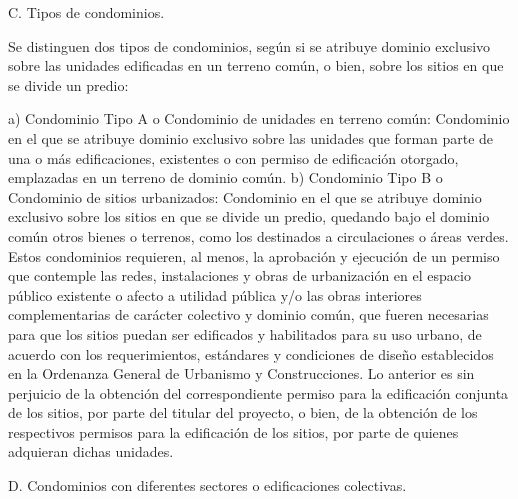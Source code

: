     C. Tipos de condominios.
     
    Se distinguen dos tipos de condominios, según si se atribuye dominio exclusivo sobre las unidades edificadas en un terreno común, o bien, sobre los sitios en que se divide un predio:
     
    a) Condominio Tipo A o Condominio de unidades en terreno común: Condominio en el que se atribuye dominio exclusivo sobre las unidades que forman parte de una o más edificaciones, existentes o con permiso de edificación otorgado, emplazadas en un terreno de dominio común.
    b) Condominio Tipo B o Condominio de sitios urbanizados: Condominio en el que se atribuye dominio exclusivo sobre los sitios en que se divide un predio, quedando bajo el dominio común otros bienes o terrenos, como los destinados a circulaciones o áreas verdes. Estos condominios requieren, al menos, la aprobación y ejecución de un permiso que contemple las redes, instalaciones y obras de urbanización en el espacio público existente o afecto a utilidad pública y/o las obras interiores complementarias de carácter colectivo y dominio común, que fueren necesarias para que los sitios puedan ser edificados y habilitados para su uso urbano, de acuerdo con los requerimientos, estándares y condiciones de diseño establecidos en la Ordenanza General de Urbanismo y Construcciones. Lo anterior es sin perjuicio de la obtención del correspondiente permiso para la edificación conjunta de los sitios, por parte del titular del proyecto, o bien, de la obtención de los respectivos permisos para la edificación de los sitios, por parte de quienes adquieran dichas unidades.
     
    D. Condominios con diferentes sectores o edificaciones colectivas.
     
